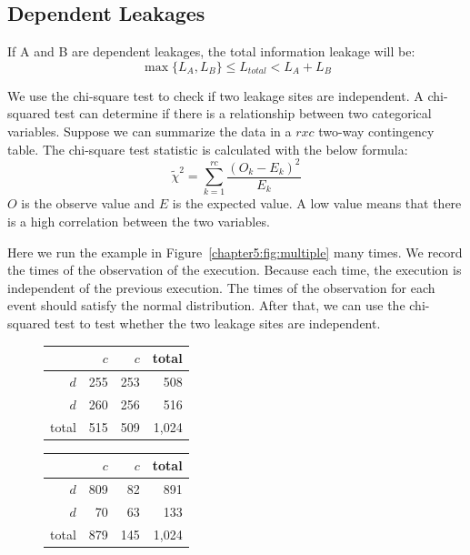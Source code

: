 \subsection{Dependent Leakages}
If A and B are dependent leakages, the total information leakage will be:
\[\max{\{L_A, L_B\}}  \leq L_{\mathit{total}} < L_A + L_B\]

We use the chi-square test to check if two leakage sites are independent. A chi-squared test can determine if there is a relationship between two categorical variables. Suppose we can summarize the data in a $rxc$  two-way contingency table. The chi-square test statistic is calculated with the below formula:
\[\tilde{\chi}^2=\sum_{k=1}^{rc} \frac{(O_k - E_k)^2}{E_k}\]
$O$ is the observe value and $E$ is the expected value. A low value means that there is a high correlation between the two variables. 

Here we run the example in Figure~\ref{chapter5:fig:multiple} many times. We record the times of the observation of the execution. Because each time, the execution is independent of the previous execution. The times of the observation for each event should satisfy the normal distribution. After that, we can use the chi-squared test to test whether the two leakage sites are independent.

\begin{figure}[h]
  \begin{minipage}{0.4\linewidth}
      \begin{tabular}{rrrr}
        \toprule
        & $c$ & $c$  & total\\
        \midrule
        $d$   & 255 & 253 &   508  \\
        $d$   & 260  & 256 &    516   \\
        total &   515 &  509   & 1,024   \\
        \bottomrule
      \end{tabular}%
  \end{minipage}
  \hfill
  \begin{minipage}{0.4\linewidth}
      \begin{tabular}{rrrr}
        \toprule
        & $c$ & $c$  & total\\
        \midrule
        $d$   & 809 & 82 & 891    \\
        $d$   & 70  & 63&  133     \\
        total &  879 &  145  & 1,024    \\
        \bottomrule
      \end{tabular}%
  \end{minipage}
  \caption{}\label{chapter5:fig:con_table}
\end{figure}

